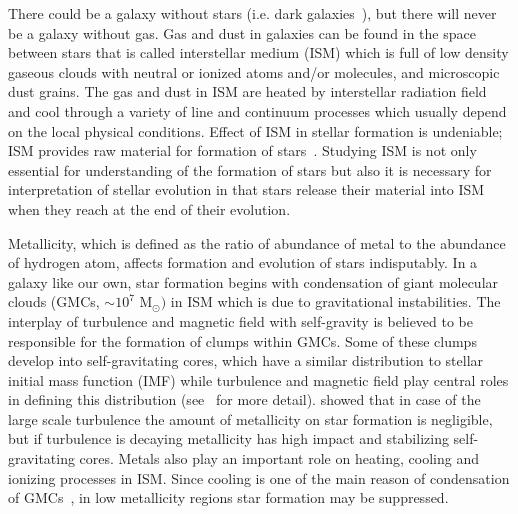 There could be a galaxy without stars (i.e. dark galaxies~\citep[][and references therein]{Cantalupo12}), but there will never be a galaxy without gas.
Gas and dust in galaxies can be found in the space between stars that is called interstellar medium (ISM) which is full of low density gaseous clouds with neutral or ionized atoms and/or molecules, and microscopic dust grains.
The gas and dust in ISM are heated by interstellar radiation field and cool through a variety of line and continuum processes which usually depend on the local physical conditions. 
Effect of ISM in stellar formation is undeniable; ISM provides raw material for formation of stars~\citep[e.g.][]{Kennicutt08,Bigiel08}.
Studying ISM is not only essential for understanding of the formation of stars but also it is necessary for interpretation of stellar evolution in that stars release their material into ISM when they reach at the end of their evolution.

Metallicity, which is defined as the ratio of abundance of metal to the abundance of hydrogen atom, affects formation and evolution of stars indisputably.
In a galaxy like our own, star formation begins with condensation of giant molecular clouds (GMCs, $\sim 10^7$ M$_{\odot})$ in ISM which is due to gravitational instabilities. 
The interplay of turbulence and magnetic field with self-gravity is believed to be responsible for the formation of clumps within GMCs. 
Some of these clumps develop into self-gravitating cores, which have a similar distribution to stellar initial mass function (IMF) while turbulence and magnetic field play central roles in defining this distribution (see~\cite{McKee07} for more detail).
\cite{Walch11} showed that in case of the large scale turbulence the amount of metallicity on star formation is negligible, but if turbulence is decaying  metallicity has high impact and stabilizing self-gravitating cores.
Metals also play an important role on heating, cooling and ionizing processes in ISM. %
Since cooling is one of the main reason of condensation of GMCs~\citep[e.g.][]{Maio07}, in low metallicity regions star formation may be suppressed. %

